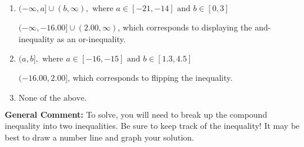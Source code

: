\documentclass{extbook}[14pt]
\begin{document}
\begin{enumerate}
{\begin{enumerate}[label=\Alph*.]
$[-16.00, 2.00)$, which is the correct option.
\item \( (-\infty, a] \cup (b, \infty), \text{ where } a \in [-21, -14] \text{ and } b \in [0, 3] \)

$(-\infty, -16.00] \cup (2.00, \infty)$, which corresponds to displaying the and-inequality as an or-inequality.
\item \( (a, b], \text{ where } a \in [-16, -15] \text{ and } b \in [1.3, 4.5] \)

$(-16.00, 2.00]$, which corresponds to flipping the inequality.
\item \( \text{None of the above.} \)


\end{enumerate}

\textbf{General Comment:} To solve, you will need to break up the compound inequality into two inequalities. Be sure to keep track of the inequality! It may be best to draw a number line and graph your solution.
}
\end{enumerate}
\end{document}
